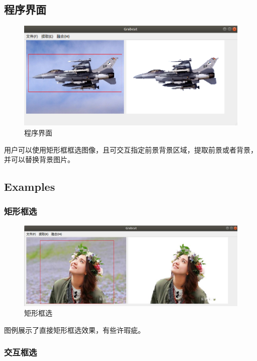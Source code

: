 \documentclass[12pt]{article}
\begin{document}
		\subsection{程序界面}
	\begin{figure}[H]
		\centering
		\includegraphics[width=6in]{./ui.png}
		\centering
		\caption{程序界面}
	\end{figure}
	
	用户可以使用矩形框框选图像，且可交互指定前景背景区域，提取前景或者背景，并可以替换背景图片。
	
	\subsection{Examples}
	
	\subsubsection{矩形框选}
	
	\begin{figure}[H]
		\centering
		\includegraphics[width=6in]{./1.png}
		\centering
		\caption{矩形框选}
	\end{figure}
	图例展示了直接矩形框选效果，有些许瑕疵。
	
	\subsubsection{交互框选}
	
\end{document}
